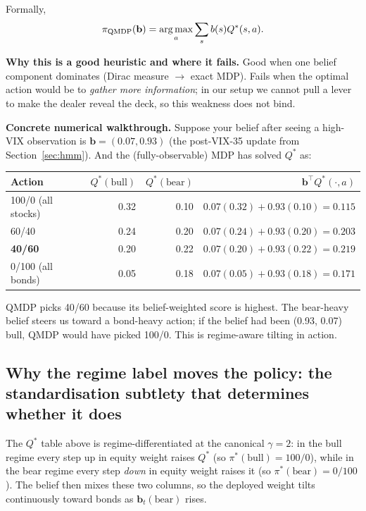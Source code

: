 \documentclass[11pt]{article}
\theoremstyle{plain1}
\theoremstyle{definition1}
\newcommand{\argmax}{\operatorname*{arg\,max}}
\newcommand{\1}{\mathbf{1}}
\newcommand{\bel}{\mathbf{b}}
\begin{document}
Formally,
\[
\pi_{\rm QMDP}(\bel) = \argmax_a \sum_s b(s) Q^\ast(s, a).
\]

\textbf{Why this is a good heuristic and where it fails.} Good when one belief component dominates (Dirac measure $\to$ exact MDP). Fails when the optimal action would be to \emph{gather more information}; in our setup we cannot pull a lever to make the dealer reveal the deck, so this weakness does not bind.

\textbf{Concrete numerical walkthrough.} Suppose your belief after seeing a high-VIX observation is $\bel = (0.07, 0.93)$ (the post-VIX-35 update from Section~\ref{sec:hmm}). And the (fully-observable) MDP has solved $Q^\ast$ as:
\begin{center}\small
\begin{tabular}{l rr r}
\toprule
Action & $Q^\ast(\text{bull})$ & $Q^\ast(\text{bear})$ & $\bel^\top Q^\ast(\cdot, a)$ \\
\midrule
100/0 (all stocks)& 0.32 & 0.10 & $0.07(0.32) + 0.93(0.10) = 0.115$ \\
60/40             & 0.24 & 0.20 & $0.07(0.24) + 0.93(0.20) = 0.203$ \\
\rowcolor{cb!10}\textbf{40/60} & 0.20 & 0.22 & $0.07(0.20) + 0.93(0.22) = \mathbf{0.219}$ \\
0/100 (all bonds) & 0.05 & 0.18 & $0.07(0.05) + 0.93(0.18) = 0.171$ \\
\bottomrule
\end{tabular}
\end{center}

QMDP picks 40/60 because its belief-weighted score is highest. The bear-heavy belief steers us toward a bond-heavy action; if the belief had been (0.93, 0.07) bull, QMDP would have picked 100/0. This is regime-aware tilting in action.

\subsection{Why the regime label moves the policy: the standardisation subtlety that determines whether it does}

The $Q^\ast$ table above is regime-differentiated at the canonical $\gamma = 2$: in the bull regime every step up in equity weight raises $Q^\ast$ (so $\pi^\ast(\text{bull})=100/0$), while in the bear regime every step \emph{down} in equity weight raises it (so $\pi^\ast(\text{bear})=0/100$). The belief then mixes these two columns, so the deployed weight tilts continuously toward bonds as $\bel_t(\text{bear})$ rises.
\end{document}
